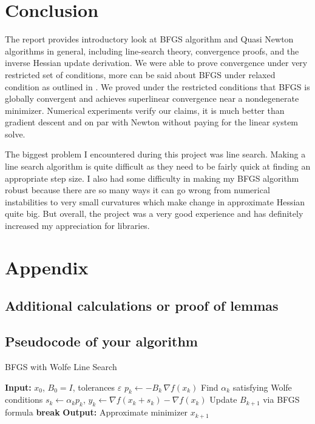 \documentclass[12pt]{report}
\begin{document}
\chapter{Conclusion}
The report provides introductory look at BFGS algorithm and Quasi Newton algorithms in general, including line-search theory, convergence proofs, and the inverse Hessian update derivation.  We were able to prove convergence under very restricted set of conditions, more can be said about BFGS under relaxed condition as outlined in \cite{nocedal}. We proved under the restricted conditions that BFGS is globally convergent and achieves superlinear convergence near a nondegenerate minimizer.  Numerical experiments verify our claims, it is much better than gradient descent and on par with Newton without paying for the linear system solve.

The biggest problem I encountered during this project was line search. Making a line search algorithm is quite difficult as they need to be fairly quick at finding an appropriate step size. I also had some difficulty in making my BFGS algorithm robust because there are so many ways it can go wrong from numerical instabilities to very small curvatures which make change in approximate Hessian quite big. But overall, the project was a very good experience and has definitely increased my appreciation for libraries.
\appendix


\chapter*{Appendix}
\renewcommand{\thesection}{\Alph{section}}

\section{Additional calculations or proof of lemmas}

\section{Pseudocode of your algorithm}

\begin{algorithm}[H]
	\caption{BFGS with Wolfe Line Search}
	\begin{algorithmic}[1]
		\State \textbf{Input:} $x_0$, $B_0=I$, tolerances $\varepsilon$
		\State $p_k \gets -B_k\,\nabla f(x_k)$
		\State Find $\alpha_k$ satisfying Wolfe conditions
		\State $s_k \gets \alpha_k p_k$, \quad $y_k \gets \nabla f(x_k+s_k)-\nabla f(x_k)$
		\State Update $B_{k+1}$ via BFGS formula
		 \textbf{break} \EndIf
		\EndFor
		\State \textbf{Output:} Approximate minimizer $x_{k+1}$
	\end{algorithmic}
\end{algorithm}


\end{document}
